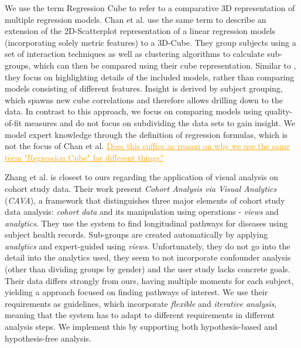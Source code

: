 \documentclass[journal]{style/vgtc} 			          %
\newcommand{\com}[1]{\textcolor{orange}{\uline{#1}}}
\begin{document}
We use the term Regression Cube to refer to a comparative 3D representation of multiple regression models.
Chan et al. \cite{Chan} use the same term to describe an extension of the 2D-Scatterplot representation of a linear regression models (incorporating solely metric features) to a 3D-Cube.
They group subjects using a set of interaction techniques as well as clustering algorithms to calculate sub-groups, which can then be compared using their cube representation.
Similar to \cite{Piringer}, they focus on highlighting details of the included models, rather than comparing models consisting of different features.
Insight is derived by subject grouping, which spawns new cube correlations and therefore allows drilling down to the data.
In contrast to this approach, we focus on comparing models using quality-of-fit measures and do not focus on subdividing the data sets to gain insight.
We model expert knowledge through the definition of regression formulas, which is not the focus of Chan et al.
\com{Does this suffice as reason on why we use the same term "Regression Cube" for different things?}

Zhang et al. \cite{Zhang2014} is closest to ours regarding the application of visual analysis on cohort study data.
Their work present \emph{Cohort Analysis via Visual Analytics} (\emph{CAVA}), a framework that distinguishes three major elements of cohort study data analysis: \emph{cohort data} and its manipulation using operations - \emph{views} and \emph{analytics}.
They use the system to find longitudinal pathways for diseases using subject health records.
Sub-groups are created automatically by applying \emph{analytics} and expert-guided using \emph{views}.
Unfortunately, they do not go into the detail into the analytics used, they seem to not incorporate confounder analysis (other than dividing groups by gender) and the user study lacks concrete goals.
Their data differs strongly from ours, having multiple moments for each subject, yielding a approach focused on finding pathways of interest.
We use their requirements as guidelines, which incorporate \emph{flexible} and \emph{iterative analysis}, meaning that the system has to adapt to different requirements in different analysis steps.
We implement this by supporting both hypothesis-based and hypothesis-free analysis.
\end{document}
